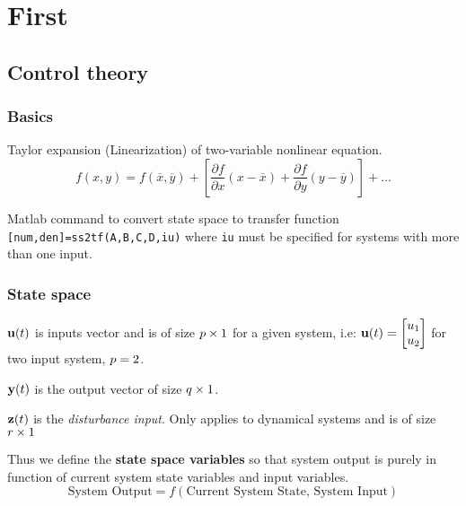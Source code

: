 \documentclass[11pt, a4paper, twoside, openright]{book}
\newcommand{\dimin}{\dimfont{p}}
\newcommand{\dimout}{\dimfont{q}}
\newcommand{\dimdisturb}{\dimfont{r}}
\begin{document}
%	
\chapter{First}

\section{Control theory}
\subsection{Basics}
Taylor expansion (Linearization) of two-variable nonlinear equation.
\[
f(x,y) = f(\overline{x},\overline{y}) + \left[ \frac{\partial f}{\partial x} (x-\overline{x}) +\frac{\partial f}{\partial y} (y-\overline{y}) \right] + \ldots
\]


Matlab command to convert state space to transfer function \verb|[num,den]=ss2tf(A,B,C,D,iu)| where \verb|iu| must be specified for systems with more than one input.








\subsection{State space}
\(\mathbf{u}(t)\) is inputs vector and is of size \(\dimin\times 1\) for a given system, i.e: \( \mathbf{u}(t)=\begin{bmatrix}
u_1 \\ u_2
\end{bmatrix}\) for two input system, \(\dimin=2\).

\(\mathbf{y}(t) \) is the output vector of size  \(\dimout\times 1\).

\(\mathbf{z}(t)\) is the \textit{disturbance input}. Only applies to dynamical systems and is of size \(\dimdisturb \times 1\)

Thus we define the \textbf{state space variables} so that system output is purely in function of current system state variables and input variables.
\[
\text{System Output} = f\left( \text{Current System State, System Input} \right)
\]
\end{document}
